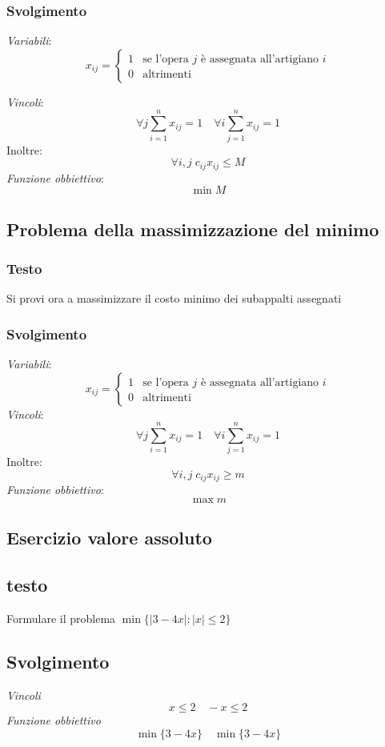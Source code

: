 \subsubsection{Svolgimento}
\textit{Variabili}:
\[
    x_{ij} = \begin{cases}
        1 & \text{se l'opera $j$ è assegnata all'artigiano $i$}\\
        0 & \text{altrimenti}
    \end{cases}
\]

\textit{Vincoli}:
\[
    \forall j \sum^n_{i=1}x_{ij}=1 \quad \forall i \sum_{j=1}^n x_{ij}=1 
\]
Inoltre: 
\[
    \forall i, j\; c_{ij}x_{ij}\leq M
\]
\textit{Funzione obbiettivo}:
\[
    \min M
\]

\subsection{Problema della massimizzazione del minimo}
\subsubsection{Testo}
Si provi ora a massimizzare il costo minimo dei subappalti assegnati
\subsubsection{Svolgimento}
\textit{Variabili}:
\[
    x_{ij} = \begin{cases}
        1 & \text{se l'opera $j$ è assegnata all'artigiano $i$}\\
        0 & \text{altrimenti}
    \end{cases}
\]
\textit{Vincoli}:
\[
    \forall j \sum^n_{i=1}x_{ij}=1 \quad \forall i \sum_{j=1}^n x_{ij}=1
\]
Inoltre:
\[
    \forall i, j\; c_{ij}x_{ij}\geq m
\]
\textit{Funzione obbiettivo}:
\[
    \max m
\]

\subsection{Esercizio valore assoluto}
\subsection{testo}
Formulare il problema $\min\{|3 - 4x| : |x| \leq 2\}$
\subsection{Svolgimento}
\textit{Vincoli}
\[
    x \leq 2 \quad -x\leq 2
\]
\textit{Funzione obbiettivo}
\[
    \min\{3-4x\} \quad \min\{3-4x\}
\]


